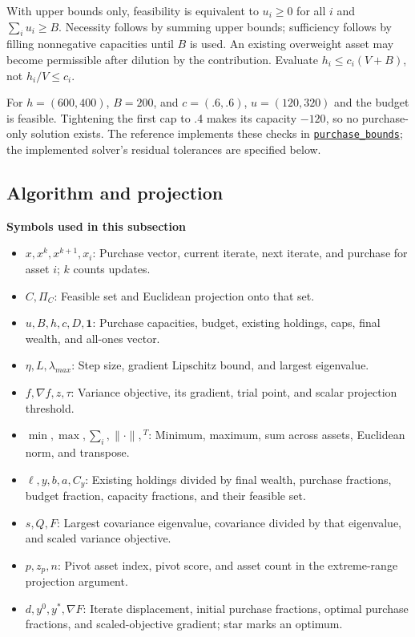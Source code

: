 \documentclass[
  american,
  11pt,
]{article}
\begin{document}
With upper bounds only, feasibility is equivalent to \(u_i\ge0\) for all
\(i\) and \(\sum_i u_i\ge B\). Necessity follows by summing upper
bounds; sufficiency follows by filling nonnegative capacities until
\(B\) is used. An existing overweight asset may become permissible after
dilution by the contribution. Evaluate \(h_i\le c_i(V+B)\), not
\(h_i/V\le c_i\).

For \(h=(600,400)\), \(B=200\), and \(c=(.6,.6)\), \(u=(120,320)\) and
the budget is feasible. Tightening the first cap to .4 makes its
capacity \(-120\), so no purchase-only solution exists. The reference
implements these checks in
\href{https://github.com/eshangark/portfolio-risk-engine/blob/main/src/portfolio_risk/reference.py}{\texttt{purchase\_bounds}};
the implemented solver's residual tolerances are specified below.

\subsection{Algorithm and projection}\label{algorithm-and-projection}

\textbf{Symbols used in this subsection}
\begin{itemize}
\item \(x,x^k,x^{k+1},x_i\): Purchase vector, current iterate, next iterate, and purchase for asset $i$; $k$ counts updates.
\item \(C,\Pi_C\): Feasible set and Euclidean projection onto that set.
\item \(u,B,h,c,D,\mathbf1\): Purchase capacities, budget, existing holdings, caps, final wealth, and all-ones vector.
\item \(\eta,L,\lambda_{max}\): Step size, gradient Lipschitz bound, and largest eigenvalue.
\item \(f,\nabla f,z,\tau\): Variance objective, its gradient, trial point, and scalar projection threshold.
\item \(\min,\max,\sum_i,\|\cdot\|,{}^T\): Minimum, maximum, sum across assets, Euclidean norm, and transpose.
\item \(\ell,y,b,a,C_y\): Existing holdings divided by final wealth, purchase fractions, budget fraction, capacity fractions, and their feasible set.
\item \(s,Q,F\): Largest covariance eigenvalue, covariance divided by that eigenvalue, and scaled variance objective.
\item \(p,z_p,n\): Pivot asset index, pivot score, and asset count in the extreme-range projection argument.
\item \(d,y^0,y^*,\nabla F\): Iterate displacement, initial purchase fractions, optimal purchase fractions, and scaled-objective gradient; star marks an optimum.
\end{itemize}
\end{document}
